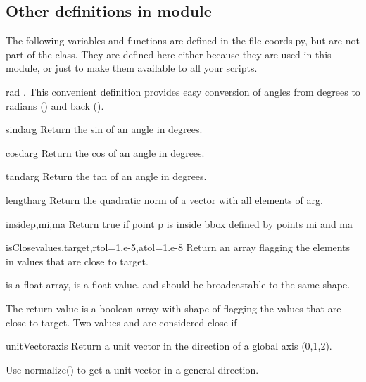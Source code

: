 \subsection{Other definitions in module }
The following variables and functions are defined in the file coords.py, 
but are not part of the  class. They are defined here either
because they are used in this module, or just to make them available to all
your scripts.

\begin{datadesc}{rad}
. This convenient definition provides easy conversion of angles from degrees to radians () and back ().
\end{datadesc}

\begin{funcdesc}{sind}{arg}
    Return the sin of an angle in degrees.
\end{funcdesc}

\begin{funcdesc}{cosd}{arg}
    Return the cos of an angle in degrees.
\end{funcdesc}

\begin{funcdesc}{tand}{arg}
    Return the tan of an angle in degrees.
\end{funcdesc}

\begin{funcdesc}{length}{arg}
    Return the quadratic norm of a vector with all elements of arg.
\end{funcdesc}

\begin{funcdesc}{inside}{p,mi,ma}
    Return true if point p is inside bbox defined by points mi and ma
\end{funcdesc}

\begin{funcdesc}{isClose}{values,target,rtol=1.e-5,atol=1.e-8}
Return an array flagging the elements in values that are close to target.

 is a float array,  is a float value.
 and  should be broadcastable to the same shape.
    
The return value is a boolean array with shape of  flagging
the values that are close to target.
Two values  and   are considered close if 
\end{funcdesc}


\begin{funcdesc}{unitVector}{axis}
Return a unit vector in the direction of a global axis (0,1,2).

Use normalize() to get a unit vector in a general direction.
\end{funcdesc}


